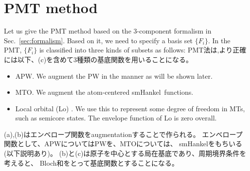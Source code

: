 \documentclass[twocolumn,showpacs,preprintnumbers,amsmath,amssymb,floatfix]{revtex4-1}
\newcommand{\bfR}{{\bf R}}
\newcommand{\refsec}[1]{\mbox{Sec.~\!\ref{#1}}}
\def\smh{smHankel}
\def\smh{smHankel}
\begin{document}
\section{PMT method}
\label{sec:pmtmethod} Let us give the PMT method based on the
3-component formalism in \refsec{sec:formalism}. Based on it, we need to
specify a basis set $\{F_i\}$.  In the PMT, $\{F_i\}$ is classified into
three kinds of subsets as follows:
PMT法は,より正確には以下、(c)を含めて3種類の基底関数を用いることになる。
\begin{itemize}
\item[(a)] APW. We augment the PW in the manner as will be shown later.

\item[(b)] MTO. We augment the atom-centered \smh\ functions. 

\item[(c)] Local orbital (Lo) \cite{lo}.
   We use this to represent some degree of freedom in MTs,
   such as semicore states. The envelope function of Lo is zero overall.

\end{itemize}
(a),(b)はエンベロープ関数をaugmentationすることで作られる。
エンベロープ関数として、APWについてはPWを、MTOについては、
\smh をもちいる(以下説明あり)。
(b)と(c)は原子を中心とする局在基底であり、周期境界条件を考えると、
Bloch和をとって基底関数とすることになる。
\end{document}
